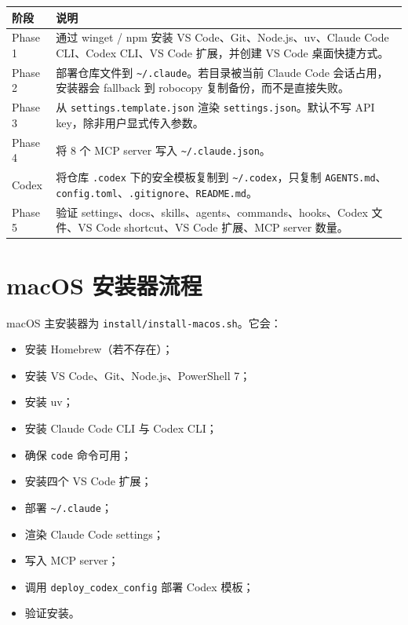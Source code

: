 \documentclass[11pt,a4paper]{ctexbook}
\begin{document}
\begin{longtable}{p{}p{}}
\toprule
阶段 & 说明 \\
\midrule
Phase 1 & 通过 winget / npm 安装 VS Code、Git、Node.js、uv、Claude Code CLI、Codex CLI、VS Code 扩展，并创建 VS Code 桌面快捷方式。 \\
Phase 2 & 部署仓库文件到 \texttt{\textasciitilde/.claude}。若目录被当前 Claude Code 会话占用，安装器会 fallback 到 robocopy 复制备份，而不是直接失败。 \\
Phase 3 & 从 \texttt{settings.template.json} 渲染 \texttt{settings.json}。默认不写 API key，除非用户显式传入参数。 \\
Phase 4 & 将 8 个 MCP server 写入 \texttt{\textasciitilde/.claude.json}。 \\
Codex & 将仓库 \texttt{.codex} 下的安全模板复制到 \texttt{\textasciitilde/.codex}，只复制 \texttt{AGENTS.md}、\texttt{config.toml}、\texttt{.gitignore}、\texttt{README.md}。 \\
Phase 5 & 验证 settings、docs、skills、agents、commands、hooks、Codex 文件、VS Code shortcut、VS Code 扩展、MCP server 数量。 \\
\bottomrule
\end{longtable}

\section{macOS 安装器流程}

macOS 主安装器为 \texttt{install/install-macos.sh}。它会：

\begin{itemize}[leftmargin=2em]
  \item 安装 Homebrew（若不存在）；
  \item 安装 VS Code、Git、Node.js、PowerShell 7；
  \item 安装 uv；
  \item 安装 Claude Code CLI 与 Codex CLI；
  \item 确保 \texttt{code} 命令可用；
  \item 安装四个 VS Code 扩展；
  \item 部署 \texttt{\textasciitilde/.claude}；
  \item 渲染 Claude Code settings；
  \item 写入 MCP server；
  \item 调用 \texttt{deploy\_codex\_config} 部署 Codex 模板；
  \item 验证安装。
\end{itemize}
\end{document}
